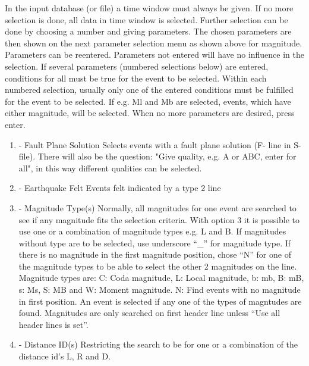 In the input database (or file) a time window must always be given. If no more selection is done, all data in time window is selected. Further selection can be done by choosing a number and giving parameters. The chosen parameters are then shown on the next parameter selection menu as shown above for magnitude. Parameters can be reentered. Parameters not entered will have no influence in the selection. If several parameters (numbered selections below) are entered, conditions for all must be true for the event to be selected. Within each numbered selection, usually only one of the entered conditions must be fulfilled for the event to be selected. If e.g. Ml and Mb are selected, events, which have either magnitude, will be selected. When no more parameters are desired, press enter. 
\begin{enumerate}
\item 
- Fault Plane Solution \newline
Selects events with a fault plane solution (F- line in S-file). 
There will also be the question: "Give quality, e.g. A or ABC, enter for all", in this way different qualities can be selected.
\item 
- Earthquake Felt\newline
{}Events felt indicated by a type 2 line 
\item 
- Magnitude Type(s) \newline
Normally, all magnitudes for one event are searched to see if any 
magnitude fits the selection criteria. With option 3 it is possible 
to use one or a combination of magnitude types e.g. L and B. If 
magnitudes without type are to be 
selected, use underscore ``\_'' for magnitude type. If there is no 
magnitude in the first magnitude position, chose ``N'' for one of the 
magnitude types to be able to select the other 2 magnitudes on the 
line. 
Magnitude types are: C: Coda magnitude, 
L: Local magnitude, b: mb, B: mB, s: 
Ms, S: MB and W: Moment magnitude. N: Find events with no 
magnitude in first position. An event is selected if any one of the 
types of magntudes are found. Magnitudes are only searched on first 
header line unless ``Use all header lines is set''.
\item 
- Distance ID(s)                           \newline
Restricting the search to be for one or a combination of the distance id's L, R and D. 

\end{enumerate}
